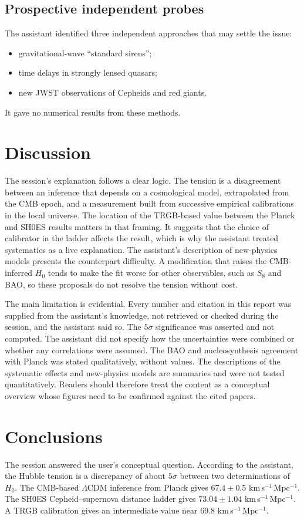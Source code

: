 \documentclass[11pt,a4paper]{article}
\begin{document}
\subsection{Prospective independent probes}
The assistant identified three independent approaches that may settle the issue:
\begin{itemize}
\item gravitational-wave ``standard sirens'';
\item time delays in strongly lensed quasars;
\item new JWST observations of Cepheids and red giants.
\end{itemize}
It gave no numerical results from these methods.

\section{Discussion}
The session's explanation follows a clear logic. The tension is a disagreement between an inference that depends on a cosmological model, extrapolated from the CMB epoch, and a measurement built from successive empirical calibrations in the local universe. The location of the TRGB-based value between the Planck and SH0ES results matters in that framing. It suggests that the choice of calibrator in the ladder affects the result, which is why the assistant treated systematics as a live explanation. The assistant's description of new-physics models presents the counterpart difficulty. A modification that raises the CMB-inferred $H_0$ tends to make the fit worse for other observables, such as $S_8$ and BAO, so these proposals do not resolve the tension without cost.

The main limitation is evidential. Every number and citation in this report was supplied from the assistant's knowledge, not retrieved or checked during the session, and the assistant said so. The $5\sigma$ significance was asserted and not computed. The assistant did not specify how the uncertainties were combined or whether any correlations were assumed. The BAO and nucleosynthesis agreement with Planck was stated qualitatively, without values. The descriptions of the systematic effects and new-physics models are summaries and were not tested quantitatively. Readers should therefore treat the content as a conceptual overview whose figures need to be confirmed against the cited papers.

\section{Conclusions}
The session answered the user's conceptual question. According to the assistant, the Hubble tension is a discrepancy of about $5\sigma$ between two determinations of $H_0$. The CMB-based $\Lambda$CDM inference from Planck gives $67.4 \pm 0.5$ km\,s$^{-1}$\,Mpc$^{-1}$. The SH0ES Cepheid--supernova distance ladder gives $73.04 \pm 1.04$ km\,s$^{-1}$\,Mpc$^{-1}$. A TRGB calibration gives an intermediate value near $69.8$ km\,s$^{-1}$\,Mpc$^{-1}$.
\end{document}
